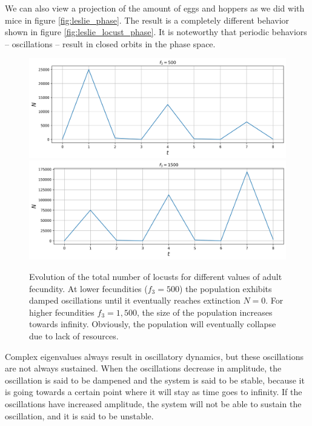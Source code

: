 \documentclass{tufte-book} %
\begin{document}
We can also view a projection of the amount of eggs and hoppers as we did with mice in figure \ref{fig:leslie_phase}. The result is a completely different behavior shown in figure \ref{fig:leslie_locust_phase}. It is noteworthy that periodic behaviors -- oscillations -- result in closed orbits in the phase space. 



\begin{figure}
	\begin{center}
		\includegraphics[width=\textwidth]{tot_locusts_evol_dec}
		\includegraphics[width=\textwidth]{tot_locusts_evol_inc}
	\end{center}
	\caption{Evolution of the total number of locusts for different values of adult fecundity. At lower fecundities ($f_3 = 500$) the population exhibits damped oscillations until it eventually reaches extinction $N=0$. For higher fecundities $f_3 = 1,500$, the size of the population increases towards infinity. Obviously, the population will eventually collapse due to lack of resources.}
	\label{fig:Llocusts_stability}
\end{figure}

Complex eigenvalues always result in oscillatory dynamics, but these oscillations are not always sustained. When the oscillations decrease in amplitude, the oscillation is said to be dampened and the system is said to be stable, because it is going towards a certain point where it will stay as time goes to infinity. If the oscillations have increased amplitude, the system will not be able to sustain the oscillation, and it is said to be unstable.
\end{document}

